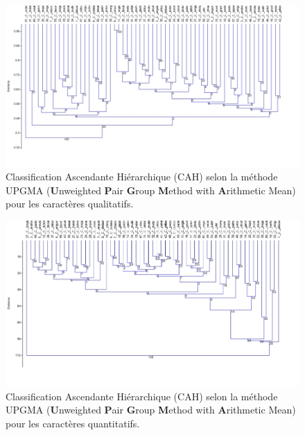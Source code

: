 \documentclass[a4paper]{article}
\theoremstyle{definition}
\theoremstyle{definition}
\theoremstyle{definition}
\theoremstyle{remark}
\begin{document}
\begin{figure}[H]

{\centering \includegraphics[width=1\linewidth]{figure/fig10b} 

}

\caption{Classification Ascendante Hiérarchique (CAH) selon la
méthode UPGMA (\textbf{U}nweighted \textbf{P}air \textbf{G}roup
\textbf{M}ethod with \textbf{A}rithmetic Mean) pour les caractères
qualitatifs.}\label{fig:fig10b}
\end{figure}






\begin{figure}[H]

{\centering \includegraphics[width=1\linewidth]{figure/fig10c} 

}

\caption{Classification Ascendante Hiérarchique (CAH) selon la
méthode UPGMA (\textbf{U}nweighted \textbf{P}air \textbf{G}roup
\textbf{M}ethod with \textbf{A}rithmetic Mean) pour les caractères
quantitatifs.}\label{fig:fig10c}
\end{figure}
\end{document}
